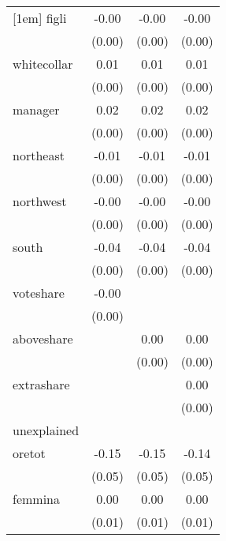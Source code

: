 {\begin{tabular}{l*{3}{c}}
[1em]
figli     &    -0.00\sym{**} &    -0.00\sym{**} &    -0.00\sym{**} \\
          &   (0.00)         &   (0.00)         &   (0.00)         \\
[1em]
whitecollar&     0.01\sym{***}&     0.01\sym{***}&     0.01\sym{***}\\
          &   (0.00)         &   (0.00)         &   (0.00)         \\
[1em]
manager   &     0.02\sym{***}&     0.02\sym{***}&     0.02\sym{***}\\
          &   (0.00)         &   (0.00)         &   (0.00)         \\
[1em]
northeast &    -0.01\sym{**} &    -0.01\sym{***}&    -0.01\sym{***}\\
          &   (0.00)         &   (0.00)         &   (0.00)         \\
[1em]
northwest &    -0.00         &    -0.00\sym{*}  &    -0.00\sym{*}  \\
          &   (0.00)         &   (0.00)         &   (0.00)         \\
[1em]
south     &    -0.04\sym{***}&    -0.04\sym{***}&    -0.04\sym{***}\\
          &   (0.00)         &   (0.00)         &   (0.00)         \\
[1em]
voteshare &    -0.00         &                  &                  \\
          &   (0.00)         &                  &                  \\
[1em]
aboveshare&                  &     0.00\sym{*}  &     0.00         \\
          &                  &   (0.00)         &   (0.00)         \\
[1em]
extrashare&                  &                  &     0.00\sym{**} \\
          &                  &                  &   (0.00)         \\
\hline
unexplained&                  &                  &                  \\
oretot    &    -0.15\sym{**} &    -0.15\sym{**} &    -0.14\sym{**} \\
          &   (0.05)         &   (0.05)         &   (0.05)         \\
[1em]
femmina   &     0.00         &     0.00         &     0.00         \\
          &   (0.01)         &   (0.01)         &   (0.01)         \\
[1em]

\end{tabular}}
